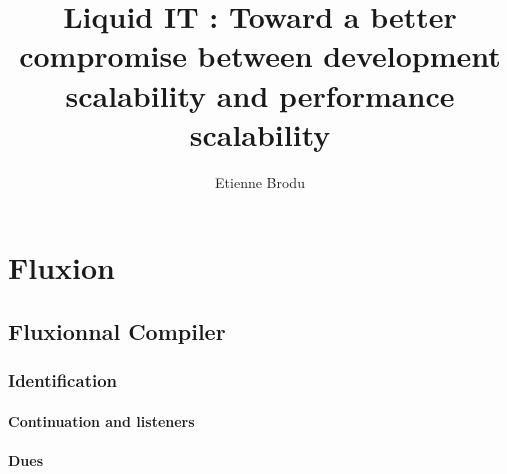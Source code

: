\documentclass[12pt]{report}
\begin{document}
\title{Liquid IT : Toward a better compromise between development scalability and performance scalability }
\author{Etienne Brodu}

\maketitle



\dominitoc%
\tableofcontents




% 


\chapter{Fluxion}

  \section{Fluxionnal Compiler}
    \subsection{Identification}
      \subsubsection{Continuation and listeners}
      \subsubsection{Dues}
\end{document}
